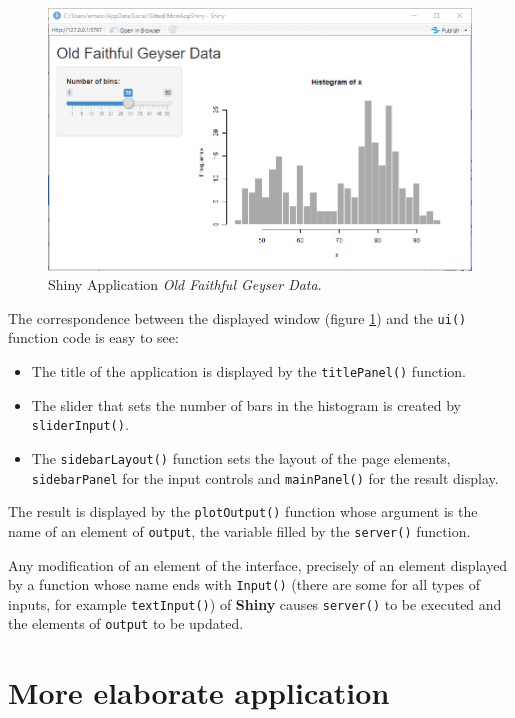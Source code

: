\documentclass[
  12pt,
  american,
  a4paper,
  extrafontsizes,onecolumn,openright
  ]{memoir}
\providecommand{\tightlist}{%
  \setlength{\itemsep}{0pt}\setlength{\parskip}{0pt}}
\newlength{\rf}
\begin{document}
\scriptsize

\begin{figure}

{\centering \includegraphics[width=0.8\linewidth]{images/shiny-geiser} 

}

\caption{Shiny Application \emph{Old Faithful Geyser Data}.}\label{fig:shiny-geiser}
\end{figure}

\normalsize

The correspondence between the displayed window (figure \ref{fig:shiny-geiser}) and the \texttt{ui()} function code is easy to see:

\begin{itemize}
\tightlist
\item
  The title of the application is displayed by the \texttt{titlePanel()} function.
\item
  The slider that sets the number of bars in the histogram is created by \texttt{sliderInput()}.
\item
  The \texttt{sidebarLayout()} function sets the layout of the page elements, \texttt{sidebarPanel} for the input controls and \texttt{mainPanel()} for the result display.
\end{itemize}

The result is displayed by the \texttt{plotOutput()} function whose argument is the name of an element of \texttt{output}, the variable filled by the \texttt{server()} function.

Any modification of an element of the interface, precisely of an element displayed by a function whose name ends with \texttt{Input()} (there are some for all types of inputs, for example \texttt{textInput()}) of \textbf{Shiny} causes \texttt{server()} to be executed and the elements of \texttt{output} to be updated.

\section{More elaborate application}\label{more-elaborate-application}
\end{document}
